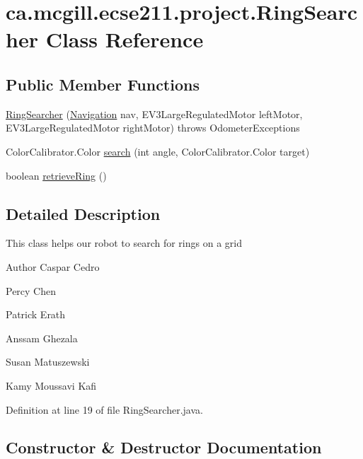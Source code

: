 \hypertarget{classca_1_1mcgill_1_1ecse211_1_1project_1_1_ring_searcher}{}\section{ca.\+mcgill.\+ecse211.\+project.\+Ring\+Searcher Class Reference}
\label{classca_1_1mcgill_1_1ecse211_1_1project_1_1_ring_searcher}
\subsection*{Public Member Functions}
\begin{DoxyCompactItemize}
\item 
\hyperlink{classca_1_1mcgill_1_1ecse211_1_1project_1_1_ring_searcher_a98ffa8d6e451641c719e1919f62f09a1}{Ring\+Searcher} (\hyperlink{classca_1_1mcgill_1_1ecse211_1_1project_1_1_navigation}{Navigation} nav, E\+V3\+Large\+Regulated\+Motor left\+Motor, E\+V3\+Large\+Regulated\+Motor right\+Motor)  throws Odometer\+Exceptions 
\item 
Color\+Calibrator.\+Color \hyperlink{classca_1_1mcgill_1_1ecse211_1_1project_1_1_ring_searcher_a86d4b320aa7e8368e38c5a38c030adb3}{search} (int angle, Color\+Calibrator.\+Color target)
\item 
boolean \hyperlink{classca_1_1mcgill_1_1ecse211_1_1project_1_1_ring_searcher_a988d23ece5820b5d60c3ef7079694958}{retrieve\+Ring} ()
\end{DoxyCompactItemize}


\subsection{Detailed Description}
This class helps our robot to search for rings on a grid

\begin{DoxyAuthor}{Author}
Caspar Cedro 

Percy Chen 

Patrick Erath 

Anssam Ghezala 

Susan Matuszewski 

Kamy Moussavi Kafi 
\end{DoxyAuthor}


Definition at line 19 of file Ring\+Searcher.\+java.



\subsection{Constructor \& Destructor Documentation}
\mbox{\label{classca_1_1mcgill_1_1ecse211_1_1project_1_1_ring_searcher_a98ffa8d6e451641c719e1919f62f09a1}} 
